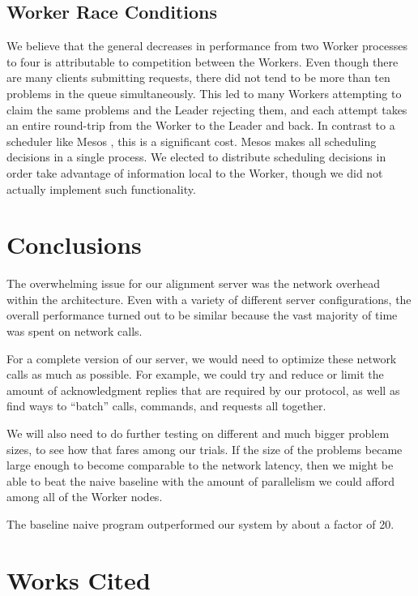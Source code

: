 \documentclass[12pt]{article}
\begin{document}
\subsection{Worker Race Conditions}
We believe that the general decreases in performance from two Worker processes to four is attributable to competition between the Workers.
Even though there are many clients submitting requests, there did not tend to be more than ten problems in the queue simultaneously.
This led to many Workers attempting to claim the same problems and the Leader rejecting them, and each attempt takes an entire round-trip from the Worker to the Leader and back.
In contrast to a scheduler like Mesos \cite{Mesos}, this is a significant cost.
Mesos makes all scheduling decisions in a single process.
We elected to distribute scheduling decisions in order take advantage of information local to the Worker, though we did not actually implement such functionality.



\section{Conclusions} 

The overwhelming issue for our alignment server was the network overhead within the architecture. Even with a variety of different server configurations, the overall performance turned out to be similar because the vast majority of time was spent on network calls. 

For a complete version of our server, we would need to optimize these network calls as much as possible. For example, we could try and reduce or limit the amount of acknowledgment replies that are required by our protocol, as well as find ways to ``batch'' calls, commands, and requests all together.

We will also need to do further testing on different and much bigger problem sizes, to see how that fares among our trials. If the size of the problems became large enough to become comparable to the network latency, then we might be able to beat the naive baseline with the amount of parallelism we could afford among all of the Worker nodes.

The baseline naive program outperformed our system by about a factor of 20.


\section{Works Cited}
\end{document}
